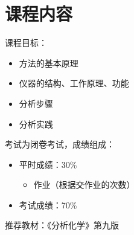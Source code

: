 \section{课程内容}%
\label{sec:课程内容}
课程目标：
\begin{itemize}
    \item 方法的基本原理
    \item 仪器的结构、工作原理、功能
    \item 分析步骤
    \item 分析实践
    
\end{itemize}
考试为闭卷考试，成绩组成：
\begin{itemize}
    \item 平时成绩：30\%
        \begin{itemize}
            \item 作业（根据交作业的次数）
        \end{itemize}
    \item 考试成绩：70\%
\end{itemize}
推荐教材：《分析化学》第九版
